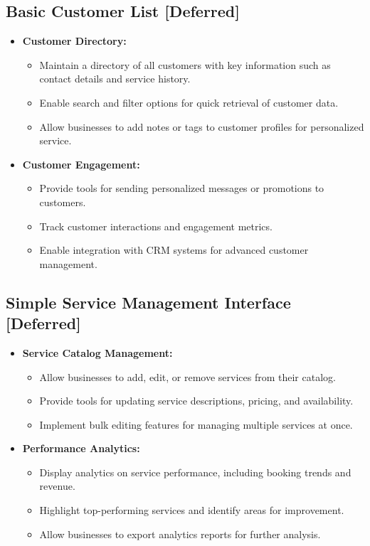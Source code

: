 \subsection{Basic Customer List [Deferred]}
\begin{itemize}[leftmargin=*]
    \item \textbf{Customer Directory:}
    \begin{itemize}
        \item Maintain a directory of all customers with key information such as contact details and service history.
        \item Enable search and filter options for quick retrieval of customer data.
        \item Allow businesses to add notes or tags to customer profiles for personalized service.
    \end{itemize}
    
    \item \textbf{Customer Engagement:}
    \begin{itemize}
        \item Provide tools for sending personalized messages or promotions to customers.
        \item Track customer interactions and engagement metrics.
        \item Enable integration with CRM systems for advanced customer management.
    \end{itemize}
\end{itemize}

\subsection{Simple Service Management Interface [Deferred]}
\begin{itemize}[leftmargin=*]
    \item \textbf{Service Catalog Management:}
    \begin{itemize}
        \item Allow businesses to add, edit, or remove services from their catalog.
        \item Provide tools for updating service descriptions, pricing, and availability.
        \item Implement bulk editing features for managing multiple services at once.
    \end{itemize}
    
    \item \textbf{Performance Analytics:}
    \begin{itemize}
        \item Display analytics on service performance, including booking trends and revenue.
        \item Highlight top-performing services and identify areas for improvement.
        \item Allow businesses to export analytics reports for further analysis.
    \end{itemize}
\end{itemize}